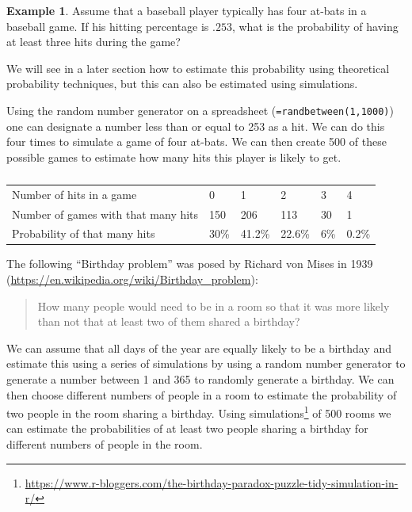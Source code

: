 \documentclass[
]{book}
\theoremstyle{definition}
\theoremstyle{definition}
\newtheorem{example}{Example}[chapter]
\theoremstyle{definition}
\theoremstyle{definition}
\theoremstyle{remark}
\begin{document}
\begin{example}

Assume that a baseball player typically has four at-bats in a baseball game. If his hitting percentage is \(.253\), what is the probability of having at least three hits during the game?

We will see in a later section how to estimate this probability using theoretical probability techniques, but this can also be estimated using simulations.

Using the random number generator on a spreadsheet (\texttt{=randbetween(1,1000)}) one can designate a number less than or equal to 253 as a hit. We can do this four times to simulate a game of four at-bats. We can then create 500 of these possible games to estimate how many hits this player is likely to get.

\begin{table}

\caption{\label{tab:unnamed-chunk-225}}
\centering
\begin{tabular}[t]{llllll}
\toprule
  &  &  &  &  & \\
\midrule
Number of hits in a game & 0 & 1 & 2 & 3 & 4\\
Number of games with that many hits & 150 & 206 & 113 & 30 & 1\\
Probability of that many hits & 30\% & 41.2\% & 22.6\% & 6\% & 0.2\%\\
\bottomrule
\end{tabular}
\end{table}

\end{example}

The following ``Birthday problem'' was posed by Richard von Mises in 1939 (\url{https://en.wikipedia.org/wiki/Birthday_problem}):

\begin{quote}
How many people would need to be in a room so that it was more likely than not that at least two of them shared a birthday?
\end{quote}

We can assume that all days of the year are equally likely to be a birthday and estimate this using a series of simulations by using a random number generator to generate a number between 1 and 365 to randomly generate a birthday. We can then choose different numbers of people in a room to estimate the probability of two people in the room sharing a birthday. Using simulations\footnote{\url{https://www.r-bloggers.com/the-birthday-paradox-puzzle-tidy-simulation-in-r/}} of 500 rooms we can estimate the probabilities of at least two people sharing a birthday for different numbers of people in the room.
\end{document}
